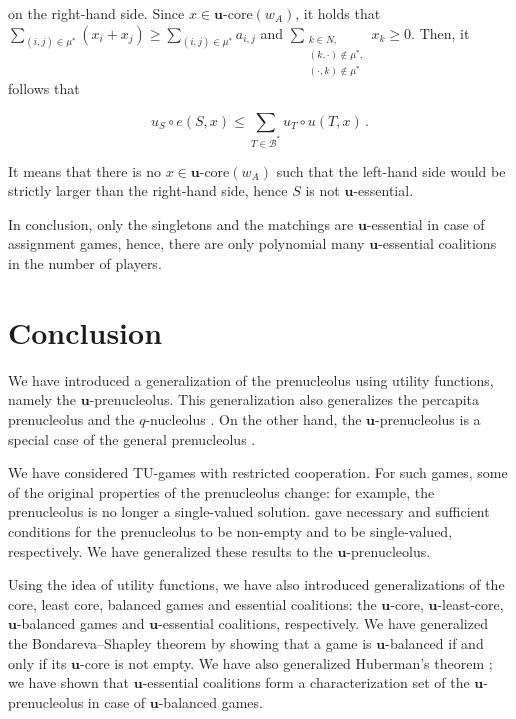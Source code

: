 \documentclass[a4paper,12pt]{article}
\theoremstyle{definition}
\theoremstyle{remark}
\begin{document}
\noindent on the right-hand side. Since $x\in \mathbf{u}$-core$(w_A)$, it holds that $\sum_{(i, j) \in \mu^*}( x_i + x_j ) \geq \sum_{(i, j) \in \mu^*} a_{i, j}$ and $\sum_{\substack{ k \in N,\\ (k, \cdot )\notin \mu^*,\\ (\cdot , k) \notin \mu^*}} x_k \geq 0$. Then, it follows that 

\begin{equation*}
u_S\circ e(S, x) \leq \sum_{T\in \mathcal{B}^*} u_T\circ u(T, x) \, .
\end{equation*}

\noindent It means that there is no $x\in \mathbf{u}$-core$(w_A)$ such that the left-hand side would be strictly larger than the right-hand side, hence $S$ is not $\mathbf{u}$-essential.

In conclusion, only the singletons and the matchings are $\mathbf{u}$-essential in case of assignment games, hence, there are only polynomial many $\mathbf{u}$-essential coalitions in the number of players.

\section{Conclusion}

We have introduced a generalization of the prenucleolus using utility functions, namely the $\mathbf{u}$-prenucleolus. This generalization also generalizes the percapita prenucleolus \citep{Grotte1970, Grotte1972} and the $q$-nucleolus \citep{Solymosi2019}. On the other hand, the $\mathbf{u}$-prenucleolus is a special case of the general prenucleolus \citep{PottersTijs1992, MaschlerPottersTijs1992}.

We have considered TU-games with restricted cooperation. For such games, some of the original properties of the prenucleolus change: for example, the prenucleolus is no longer a single-valued solution. \citet{Katsev2013} gave necessary and sufficient conditions for the prenucleolus to be non-empty and to be single-valued, respectively. We have generalized these results to the $\mathbf{u}$-prenucleolus.

Using the idea of utility functions, we have also introduced generalizations of the core, least core, balanced games and essential coalitions: the $\mathbf{u}$-core, $\mathbf{u}$-least-core, $\mathbf{u}$-balanced games and $\mathbf{u}$-essential coalitions, respectively. We have generalized the  Bondareva--Shapley theorem \citep{Bondareva1963,Shapley1967,Faigle1989} by showing that a game is $\mathbf{u}$-balanced if and only if its $\mathbf{u}$-core is not empty. We have also generalized Huberman's theorem \citep{Huberman1980}; we have shown that $\mathbf{u}$-essential coalitions form a characterization set of the $\mathbf{u}$-prenucleolus in case of $\mathbf{u}$-balanced games.
\end{document}

